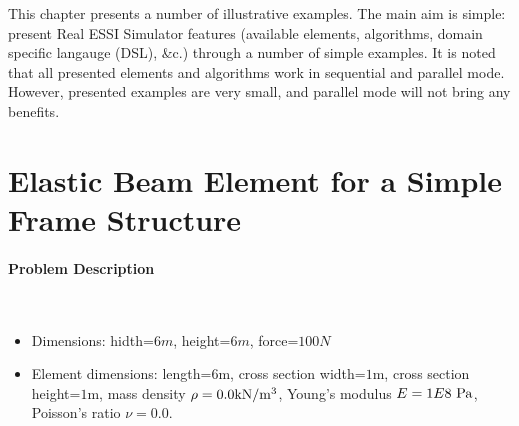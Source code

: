 

This chapter presents a number of illustrative examples.
%
The  main  aim  is  simple:  present  Real  ESSI  Simulator  features (available
elements,  algorithms, domain specific langauge (DSL), \&c.) through a number of
simple  examples. It is noted that all presented elements and algorithms work in
sequential  and  parallel  mode. However, presented examples are very small, and
parallel mode will not bring any benefits.














\section{Elastic Beam Element for a Simple Frame Structure}



\paragraph{Problem Description} ~ 


\begin{itemize} 

\item Dimensions: hidth=$6m$, height=$6m$, force=$100N$

\item Element dimensions: length=$6$m,   
                    cross section width=$1$m,   
                    cross section height=$1$m,  
                    mass density $\rho=0.0 {\rm kN/m^3}$,  
                    Young's modulus $E=1E8~{\rm Pa}$,  
                    Poisson's ratio $\nu=0.0$.
\end{itemize}


